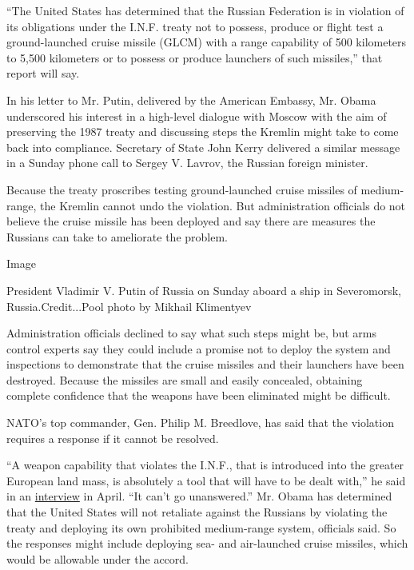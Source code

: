 ``The United States has determined that the Russian Federation is in
violation of its obligations under the I.N.F. treaty not to possess,
produce or flight test a ground-launched cruise missile (GLCM) with a
range capability of 500 kilometers to 5,500 kilometers or to possess or
produce launchers of such missiles,'' that report will say.

In his letter to Mr. Putin, delivered by the American Embassy, Mr. Obama
underscored his interest in a high-level dialogue with Moscow with the
aim of preserving the 1987 treaty and discussing steps the Kremlin might
take to come back into compliance. Secretary of State John Kerry
delivered a similar message in a Sunday phone call to Sergey V. Lavrov,
the Russian foreign minister.

Because the treaty proscribes testing ground-launched cruise missiles of
medium-range, the Kremlin cannot undo the violation. But administration
officials do not believe the cruise missile has been deployed and say
there are measures the Russians can take to ameliorate the problem.

Image

President Vladimir V. Putin of Russia on Sunday aboard a ship in
Severomorsk, Russia.Credit...Pool photo by Mikhail Klimentyev

Administration officials declined to say what such steps might be, but
arms control experts say they could include a promise not to deploy the
system and inspections to demonstrate that the cruise missiles and their
launchers have been destroyed. Because the missiles are small and easily
concealed, obtaining complete confidence that the weapons have been
eliminated might be difficult.

NATO's top commander, Gen. Philip M. Breedlove, has said that the
violation requires a response if it cannot be resolved.

``A weapon capability that violates the I.N.F., that is introduced into
the greater European land mass, is absolutely a tool that will have to
be dealt with,'' he said in an
\href{http://www.nytimes.com/2014/04/03/world/europe/nato-general-says-russian-force-poised-to-invade-ukraine.html}{interview}
in April. ``It can't go unanswered.'' Mr. Obama has determined that the
United States will not retaliate against the Russians by violating the
treaty and deploying its own prohibited medium-range system, officials
said. So the responses might include deploying sea- and air-launched
cruise missiles, which would be allowable under the accord.

